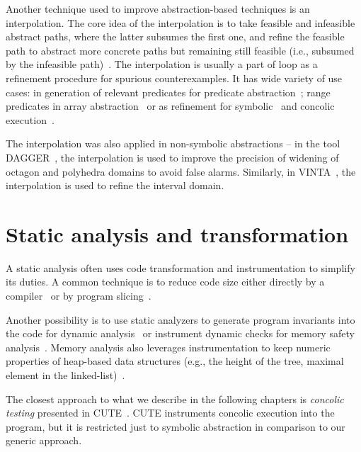 Another technique used to improve abstraction-based techniques is an
interpolation. The core idea of the interpolation is to take feasible and
infeasible abstract paths, where the latter subsumes the first one, and refine
the feasible path to abstract more concrete paths but remaining still feasible
(i.e., subsumed by the infeasible path)~\cite{Mcmillan2003interpolation}.  The
interpolation is usually a part of \cegar loop as a refinement procedure for
spurious counterexamples. It has wide variety of use cases: in generation of
relevant predicates for predicate abstraction~\cite{Henzinger2004abstractions,
Cimatti2016}; range predicates in array abstraction~\cite{Jhala2007array} or
as refinement for symbolic~\cite{Ibing2016} and concolic execution~\cite{Jaffar2013}.

The interpolation was also applied in non-symbolic abstractions -- in the tool
DAGGER~\cite{Gulavani2008}, the interpolation is used to improve the precision
of widening of octagon and polyhedra domains to avoid false alarms. Similarly,
in VINTA~\cite{Albarghouthi2012}, the interpolation is used to refine the interval domain.

\section{Static analysis and transformation}

A static analysis often uses code transformation and instrumentation to
simplify its duties. A common technique is to reduce code size either directly
by a compiler~\cite{Namjoshi2018} or by program slicing~\cite{Chalupa2018}.

Another possibility is to use static analyzers to generate program invariants into the code for dynamic analysis~\cite{Gurfinkel2015} or instrument dynamic checks for memory safety analysis~\cite{Chalupa2019}.
Memory analysis also leverages instrumentation to keep numeric properties of heap-based data structures (e.g., the height of the tree, maximal element in the linked-list)~\cite{Magill2010}.

The closest approach to what we describe in the following chapters is
\emph{concolic testing} presented in CUTE~\cite{Sen2005}. CUTE instruments concolic
execution into the program, but it is restricted just to symbolic abstraction
in comparison to our generic approach.
